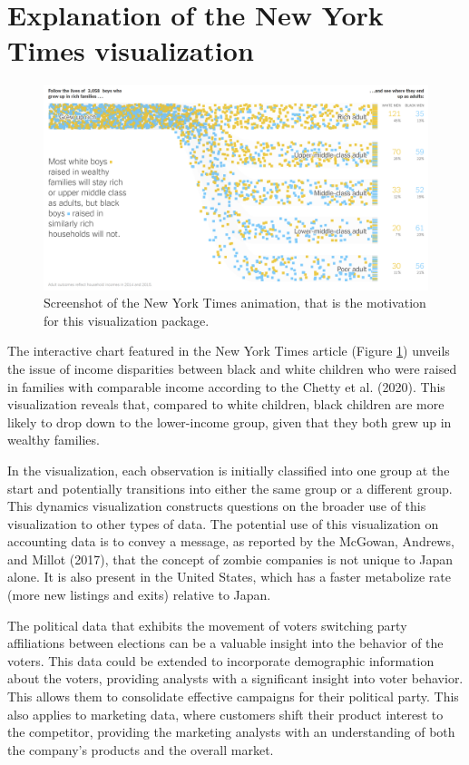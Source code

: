\hypertarget{NYT}{%
\section{Explanation of the New York Times visualization}\label{NYT}}

\begin{figure}

{\centering \includegraphics[width=1\linewidth]{figures/NYT} 

}

\caption{Screenshot of the New York Times animation, that is the motivation for this visualization package.}\label{fig:nyt}
\end{figure}

The interactive chart featured in the New York Times article (Figure \ref{fig:nyt}) unveils the issue of income disparities between black and white children who were raised in families with comparable income according to the Chetty et al. (2020). This visualization reveals that, compared to white children, black children are more likely to drop down to the lower-income group, given that they both grew up in wealthy families.

In the visualization, each observation is initially classified into one group at the start and potentially transitions into either the same group or a different group. This dynamics visualization constructs questions on the broader use of this visualization to other types of data. The potential use of this visualization on accounting data is to convey a message, as reported by the McGowan, Andrews, and Millot (2017), that the concept of zombie companies is not unique to Japan alone. It is also present in the United States, which has a faster metabolize rate (more new listings and exits) relative to Japan.

The political data that exhibits the movement of voters switching party affiliations between elections can be a valuable insight into the behavior of the voters. This data could be extended to incorporate demographic information about the voters, providing analysts with a significant insight into voter behavior. This allows them to consolidate effective campaigns for their political party. This also applies to marketing data, where customers shift their product interest to the competitor, providing the marketing analysts with an understanding of both the company's products and the overall market.

